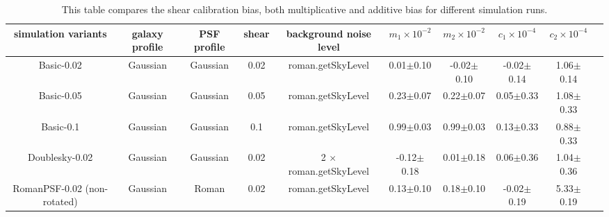 \documentclass[fleqn,usenatbib]{mnras}
\begin{document}
\begin{table}
	\centering
	\label{tab:simple_sim}
	\begin{tabular}[width=\textwidth]{ c|c|c|c|c|c|c|c|c|c } 
		\hline
		simulation variants & galaxy profile & PSF profile & shear & background noise level & $m_{1}\times10^{-2}$ & $m_{2}\times10^{-2}$ & $c_{1}\times10^{-4}$ & $c_{2}\times10^{-4}$\\
		\hline
		Basic-0.02 & Gaussian & Gaussian & 0.02 & roman.getSkyLevel & 0.01$\pm$0.10 & -0.02$\pm$0.10 & -0.02$\pm$0.14 & 1.06$\pm$0.14\\
		Basic-0.05 & Gaussian & Gaussian & 0.05 & roman.getSkyLevel & 0.23$\pm$0.07 & 0.22$\pm$0.07 & 0.05$\pm$0.33 & 1.08$\pm$0.33\\
		Basic-0.1 & Gaussian & Gaussian & 0.1 & roman.getSkyLevel & 0.99$\pm$0.03 & 0.99$\pm$0.03 & 0.13$\pm$0.33 & 0.88$\pm$0.33\\
		\hline
		Doublesky-0.02 & Gaussian & Gaussian & 0.02 & 2 $\times$ roman.getSkyLevel & -0.12$\pm$0.18 & 0.01$\pm$0.18 & 0.06$\pm$0.36 & 1.04$\pm$0.36\\
		\hline
		RomanPSF-0.02 (non-rotated) & Gaussian & Roman & 0.02 & roman.getSkyLevel & 0.13$\pm$0.10 & 0.18$\pm$0.10 & -0.02$\pm$0.19 & 5.33$\pm$0.19\\
		\hline
	\end{tabular}
	\caption{This table compares the shear calibration bias, both multiplicative and additive bias for different simulation runs.}
	\label{tab:result}
\end{table}
\end{document}
